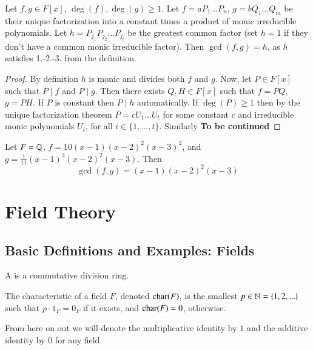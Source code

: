 \documentclass[12pt, a4paper, oneside, openright, titlepage]{book}
\begin{document}
\begin{claim}
        Let $f,g \in F[x]$, $\deg(f),\deg(g) \geq 1$. Let $f = aP_1...P_n$, $g = bQ_1...Q_m$ be their unique factorization into a constant times a product of monic irreducible polynomials. Let $h = P_{j_1}P_{j_2}...P_{j_l}$ be the greatest common factor (set $h = 1$ if they don't have a common monic irreducible factor). Then $\gcd(f,g) = h$, as $h$ satisfies 1.-2.-3. from the definition.
\end{claim}
\begin{proof}
        By definition $h$ is monic and divides both $f$ and $g$. Now, let $P \in F[x]$ such that $P\;\vert\;f$ and $P\;\vert\;g$. Then there exists $Q,H \in F[x]$ such that $f = PQ$, $g = PH$. If $P$ is constant then $P\;\vert\;h$ automatically. If $\deg(P) \geq 1$ then by the unique factorization theorem $P = cU_1...U_t$ for some constant $c$ and irreducible monic polynomials $U_i$, for all $i \in \{1,...,t\}$. Similarly \textbf{To be continued}
\end{proof}

\begin{eg}
        Let $F = \mathbb Q$, $f = 10(x-1)(x-2)^2(x-3)^2$, and $g = \frac{1}{11}(x-1)^3(x-2)^2(x-3)$. Then $$\gcd(f,g) = (x-1)(x-2)^2(x-3)$$
\end{eg}




\part{Field Theory}


\chapter{\textsection\textsection Basic Definitions and Examples: Fields}



\begin{defn}
    A  is a commutative division ring.
\end{defn}


\begin{defn}
    The characteristic of a field $F$, denoted $\operatorname{char}(F)$, is the smallest $p \in \mathbb N = \{1,2,...\}$ such that $p\cdot 1_F = 0_F$ if it exists, and $\operatorname{char}(F) = 0$, otherwise.
\end{defn}

From here on out we will denote the multiplicative identity by $1$ and the additive identity by $0$ for any field.
\end{document}
